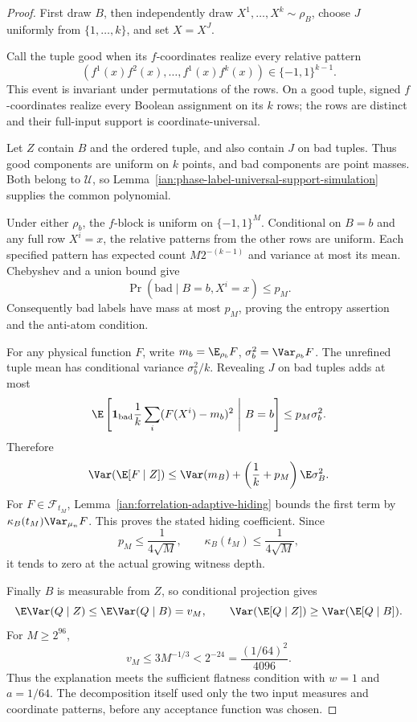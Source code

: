 \begin{proof}
First draw \(B\), then independently draw
\(X^1,\ldots,X^k\sim\rho_B\), choose \(J\) uniformly from
\(\{1,\ldots,k\}\), and set \(X=X^J\).

Call the tuple good when its \(f\)-coordinates realize every relative pattern
\[
 (f^1(x)f^2(x),\ldots,f^1(x)f^k(x))
 \in\{-1,1\}^{k-1}.
\]
This event is invariant under permutations of the rows. On a good tuple, signed \(f\)-coordinates realize every Boolean assignment on its \(k\) rows; the rows are distinct and their full-input support is coordinate-universal.

Let \(Z\) contain \(B\) and the ordered tuple, and also contain \(J\) on bad tuples. Thus good components are uniform on \(k\) points, and bad components are point masses. Both belong to \(\mathcal U\), so Lemma~\ref{ian:phase-label-universal-support-simulation} supplies the common polynomial.

Under either \(\rho_b\), the \(f\)-block is uniform on \(\{-1,1\}^M\). Conditional on \(B=b\) and any full row \(X^i=x\), the relative patterns from the other rows are uniform. Each specified pattern has expected count \(M2^{-(k-1)}\) and variance at most its mean. Chebyshev and a union bound give
\[
 \Pr(\mathrm{bad}\mid B=b,X^i=x)\le p_M.
\]
Consequently bad labels have mass at most \(p_M\), proving the entropy assertion and the anti-atom condition.

For any physical function \(F\), write
\(m_b=\E_{\rho_b}F\), \(\sigma_b^2=\Var_{\rho_b}F\).
The unrefined tuple mean has conditional variance \(\sigma_b^2/k\). Revealing \(J\) on bad tuples adds at most
\[
 \E\left[
 \mathbf1_{\mathrm{bad}}\frac1k
 \sum_i(F(X^i)-m_b)^2\ \middle|\ B=b\right]
 \le p_M\sigma_b^2.
\]
Therefore
\[
 \Var(\E[F\mid Z])
 \le\Var(m_B)+\left(\frac1k+p_M\right)\E\sigma_B^2.
\]
For \(F\in\mathcal F_{t_M}\), Lemma~\ref{ian:forrelation-adaptive-hiding} bounds the first term by \(\kappa_B(t_M)\Var_{\mu_n}F\). This proves the stated hiding coefficient. Since
\[
 p_M\le\frac1{4\sqrt M},\qquad
 \kappa_B(t_M)\le\frac1{4\sqrt M},
\]
it tends to zero at the actual growing witness depth.

Finally \(B\) is measurable from \(Z\), so conditional projection gives
\[
 \E\Var(Q\mid Z)\le\E\Var(Q\mid B)=v_M,
 \qquad
 \Var(\E[Q\mid Z])\ge\Var(\E[Q\mid B]).
\]
For \(M\ge2^{96}\),
\[
 v_M\le3M^{-1/3}<2^{-24}
 =\frac{(1/64)^2}{4096}.
\]
Thus the explanation meets the sufficient flatness condition with \(w=1\) and \(a=1/64\). The decomposition itself used only the two input measures and coordinate patterns, before any acceptance function was chosen.
\end{proof}

